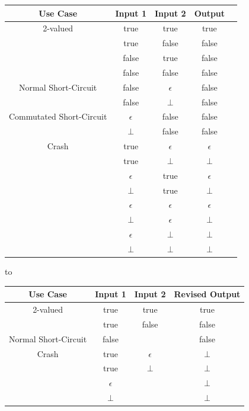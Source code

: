 \documentclass[
]{ceurart}
\begin{document}
\begin{center}
	\begin{tabular}{|c||c|c||c||c|}
		\hline
		Use Case & Input 1 & Input 2 & Output \\
		\hline
		\hline
		2-valued & true & true & true \\
		& true & false & false \\
		& false & true & false \\
		& false & false & false \\
		\hline
		Normal Short-Circuit & false & $\epsilon$ & false \\
		& false & $\bot$ & false \\
		Commutated Short-Circuit & $\epsilon$ & false & false \\
		& $\bot$ & false & false \\
		\hline
		Crash & true & $\epsilon$ & $\epsilon$ \\
		& true & $\bot$ & $\bot$ \\
		& $\epsilon$ & true & $\epsilon$ \\
		& $\bot$ & true & $\bot$ \\
		& $\epsilon$ & $\epsilon$ & $\epsilon$ \\
		& $\bot$ & $\epsilon$ & $\bot$ \\
		& $\epsilon$ & $\bot$ & $\bot$ \\
		& $\bot$ & $\bot$ & $\bot$ \\
		\hline
	\end{tabular}
\end{center}

to

\begin{center}
	\begin{tabular}{|c||c|c||c|}
		\hline
		Use Case & Input 1 & Input 2 & Revised Output \\
		\hline
		\hline
		2-valued & true & true & true \\
		& true & false & false \\
		Normal Short-Circuit & false &  & false \\
		\hline
		Crash & true & $\epsilon$ & $\bot$ \\
		& true & $\bot$ & $\bot$ \\
		& $\epsilon$ & & $\bot$ \\
		& $\bot$ & & $\bot$ \\
		\hline
	\end{tabular}
\end{center}
\end{document}
